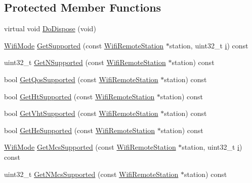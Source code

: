 \subsection*{Protected Member Functions}
\begin{DoxyCompactItemize}
\item 
virtual void \hyperlink{classns3_1_1WifiRemoteStationManager_a39d2443b156f25c494c117c427f54022}{Do\+Dispose} (void)
\item 
\hyperlink{classns3_1_1WifiMode}{Wifi\+Mode} \hyperlink{classns3_1_1WifiRemoteStationManager_a995c8bae0d84b168fd3e8bc9ecaacdd4}{Get\+Supported} (const \hyperlink{structns3_1_1WifiRemoteStation}{Wifi\+Remote\+Station} $\ast$station, uint32\+\_\+t \hyperlink{lte__uplink__power__control_8m_a6f6ccfcf58b31cb6412107d9d5281426}{i}) const 
\item 
uint32\+\_\+t \hyperlink{classns3_1_1WifiRemoteStationManager_a7316bf091ebad5b8cd1a8b5ee47554d8}{Get\+N\+Supported} (const \hyperlink{structns3_1_1WifiRemoteStation}{Wifi\+Remote\+Station} $\ast$station) const 
\item 
bool \hyperlink{classns3_1_1WifiRemoteStationManager_ae0bc24577186d167ae41147922b6b704}{Get\+Qos\+Supported} (const \hyperlink{structns3_1_1WifiRemoteStation}{Wifi\+Remote\+Station} $\ast$station) const 
\item 
bool \hyperlink{classns3_1_1WifiRemoteStationManager_a84f0f86ec191bd3a00c531f1e9639f96}{Get\+Ht\+Supported} (const \hyperlink{structns3_1_1WifiRemoteStation}{Wifi\+Remote\+Station} $\ast$station) const 
\item 
bool \hyperlink{classns3_1_1WifiRemoteStationManager_aadd376828070ef23114a95cb6b9c6013}{Get\+Vht\+Supported} (const \hyperlink{structns3_1_1WifiRemoteStation}{Wifi\+Remote\+Station} $\ast$station) const 
\item 
bool \hyperlink{classns3_1_1WifiRemoteStationManager_aec93deb86f1c4af0b6073f5cf07ed99b}{Get\+He\+Supported} (const \hyperlink{structns3_1_1WifiRemoteStation}{Wifi\+Remote\+Station} $\ast$station) const 
\item 
\hyperlink{classns3_1_1WifiMode}{Wifi\+Mode} \hyperlink{classns3_1_1WifiRemoteStationManager_af21ecff608cea2837c1af9385bbe6e4e}{Get\+Mcs\+Supported} (const \hyperlink{structns3_1_1WifiRemoteStation}{Wifi\+Remote\+Station} $\ast$station, uint32\+\_\+t \hyperlink{lte__uplink__power__control_8m_a6f6ccfcf58b31cb6412107d9d5281426}{i}) const 
\item 
uint32\+\_\+t \hyperlink{classns3_1_1WifiRemoteStationManager_a3b4fd7e5c50dfe3270831ad38de180e9}{Get\+N\+Mcs\+Supported} (const \hyperlink{structns3_1_1WifiRemoteStation}{Wifi\+Remote\+Station} $\ast$station) const 

\end{DoxyCompactItemize}
